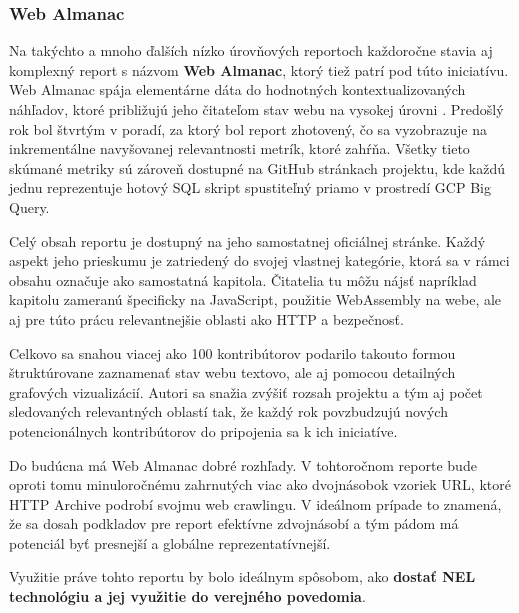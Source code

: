 \pagebreak

\subsubsection{Web Almanac}
Na takýchto a mnoho ďalších nízko úrovňových reportoch každoročne stavia aj komplexný report s názvom \textbf{Web Almanac}, ktorý tiež patrí pod túto iniciatívu.
Web Almanac spája elementárne dáta do hodnotných kontextualizovaných náhľadov, ktoré približujú jeho čitateľom stav webu na vysokej úrovni \cite{httparchive-methodology}.
Predošlý rok bol štvrtým v poradí, za ktorý bol report zhotovený, čo sa vyzobrazuje na inkrementálne navyšovanej relevantnosti metrík, ktoré zahŕňa. 
Všetky tieto skúmané metriky sú zároveň dostupné na GitHub stránkach projektu, kde každú jednu reprezentuje hotový SQL skript spustiteľný priamo v prostredí GCP Big Query.


Celý obsah reportu je dostupný na jeho samostatnej oficiálnej stránke. 
Každý aspekt jeho prieskumu je zatriedený do svojej vlastnej kategórie, ktorá sa v rámci obsahu označuje ako samostatná kapitola.
Čitatelia tu môžu nájsť napríklad kapitolu zameranú špecificky na JavaScript, použitie WebAssembly na webe, ale aj pre túto prácu relevantnejšie oblasti ako HTTP a bezpečnosť.

Celkovo sa snahou viacej ako 100 kontribútorov podarilo takouto formou štruktúrovane zaznamenať stav webu textovo, ale aj pomocou detailných grafových vizualizácií.
Autori sa snažia zvýšiť rozsah projektu a tým aj počet sledovaných relevantných oblastí tak, že každý rok povzbudzujú nových potencionálnych kontribútorov do pripojenia sa k ich iniciatíve. 

Do budúcna má Web Almanac dobré rozhľady. V tohtoročnom reporte bude oproti tomu minuloročnému zahrnutých viac ako dvojnásobok vzoriek URL, ktoré HTTP Archive podrobí svojmu web crawlingu.
V ideálnom prípade to znamená, že sa dosah podkladov pre report efektívne zdvojnásobí a tým pádom má potenciál byť presnejší a globálne reprezentatívnejší.

Využitie práve tohto reportu by bolo ideálnym spôsobom, ako \textbf{dostať NEL technológiu a jej využitie do verejného povedomia}.


